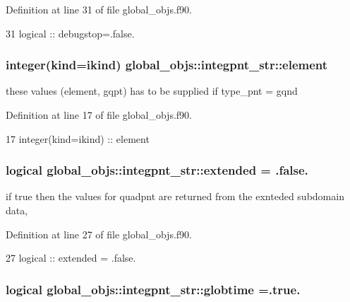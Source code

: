 Definition at line 31 of file global\+\_\+objs.\+f90.


\begin{DoxyCode}
31     \textcolor{keywordtype}{logical} :: debugstop=.false.
\end{DoxyCode}
\subsubsection[{element}]{\setlength{\rightskip}{0pt plus 5cm}integer(kind=ikind) global\+\_\+objs\+::integpnt\+\_\+str\+::element}\label{structglobal__objs_1_1integpnt__str_ac34c937c26cdcf4de593993457aef75d}


these values (element, gqpt) has to be supplied if type\+\_\+pnt = gqnd 



Definition at line 17 of file global\+\_\+objs.\+f90.


\begin{DoxyCode}
17     \textcolor{keywordtype}{integer(kind=ikind)} :: element
\end{DoxyCode}
\subsubsection[{extended}]{\setlength{\rightskip}{0pt plus 5cm}logical global\+\_\+objs\+::integpnt\+\_\+str\+::extended = .false.}\label{structglobal__objs_1_1integpnt__str_ae3ffd458bc75efb910e8942b15661132}


if true then the values for quadpnt are returned from the exnteded subdomain data, 



Definition at line 27 of file global\+\_\+objs.\+f90.


\begin{DoxyCode}
27     \textcolor{keywordtype}{logical} :: extended = .false.
\end{DoxyCode}
\subsubsection[{globtime}]{\setlength{\rightskip}{0pt plus 5cm}logical global\+\_\+objs\+::integpnt\+\_\+str\+::globtime =.true.}\label{structglobal__objs_1_1integpnt__str_ac16cb496f6a975d33b91f9892d015c97}


